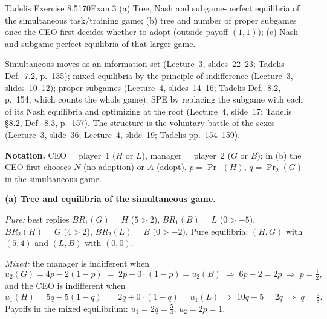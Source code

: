 \begin{exsol}{Tadelis Exercise 8.5}{170}{Exam}{3}
\asked (a) Tree, Nash and subgame-perfect equilibria of the simultaneous task/training game;
(b) tree and number of proper subgames once the CEO first decides whether to adopt (outside
payoff $(1,1)$); (c) Nash and subgame-perfect equilibria of that larger game.

\method Simultaneous moves as an information set (Lecture~3, slides~22--23; Tadelis Def.~7.2,
p.~135); mixed equilibria by the principle of indifference (Lecture~3, slides~10--12); proper
subgames (Lecture~4, slides~14--16; Tadelis Def.~8.2, p.~154, which counts the whole game); SPE
by replacing the subgame with each of its Nash equilibria and optimizing at the root
(Lecture~4, slide~17; Tadelis \S8.2, Def.~8.3, p.~157). The structure is the voluntary battle of
the sexes (Lecture~3, slide~36; Lecture~4, slide~19; Tadelis pp.~154--159).

\solution
\textbf{Notation.} CEO = player~1 ($H$ or $L$), manager = player~2 ($G$ or $B$); in (b) the CEO
first chooses $N$ (no adoption) or $A$ (adopt). $p = \Pr_1(H)$, $q = \Pr_2(G)$ in the
simultaneous game.

\textbf{(a) Tree and equilibria of the simultaneous game.}
\begin{center}
\end{center}
\emph{Pure:} best replies $BR_1(G) = H$ ($5 > 2$), $BR_1(B) = L$ ($0 > -5$), $BR_2(H) = G$
($4 > 2$), $BR_2(L) = B$ ($0 > -2$). Pure equilibria: $(H, G)$ with $(5,4)$ and $(L, B)$ with $(0,0)$.

\emph{Mixed:} the manager is indifferent when
\begin{equation}
  u_2(G) = 4p - 2(1-p) \;=\; 2p + 0\cdot(1-p) = u_2(B) \;\Rightarrow\; 6p - 2 = 2p
  \;\Rightarrow\; p = \tfrac12 , \label{eq:tadelis-8-5-p}
\end{equation}
and the CEO is indifferent when
\begin{equation}
  u_1(H) = 5q - 5(1-q) \;=\; 2q + 0\cdot(1-q) = u_1(L) \;\Rightarrow\; 10q - 5 = 2q
  \;\Rightarrow\; q = \tfrac58 . \label{eq:tadelis-8-5-q}
\end{equation}
Payoffs in the mixed equilibrium: $u_1 = 2q = \frac54$, $u_2 = 2p = 1$.


\end{exsol}
